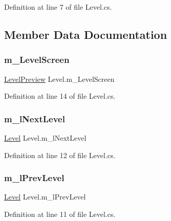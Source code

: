 Definition at line 7 of file Level.\+cs.



\subsection{Member Data Documentation}
\mbox{\label{class_level_a3c05dd260ac90122cd094bee059260e3}} 
\subsubsection{\texorpdfstring{m\+\_\+\+Level\+Screen}{m\_LevelScreen}}
{\footnotesize\ttfamily \mbox{\hyperlink{class_level_preview}{Level\+Preview}} Level.\+m\+\_\+\+Level\+Screen}



Definition at line 14 of file Level.\+cs.

\mbox{\label{class_level_af2050b246b238c342aaf60734ac0e533}} 
\subsubsection{\texorpdfstring{m\+\_\+l\+Next\+Level}{m\_lNextLevel}}
{\footnotesize\ttfamily \mbox{\hyperlink{class_level}{Level}} Level.\+m\+\_\+l\+Next\+Level}



Definition at line 12 of file Level.\+cs.

\mbox{\label{class_level_a5d13a734626467aa83674ffe7293c103}} 
\subsubsection{\texorpdfstring{m\+\_\+l\+Prev\+Level}{m\_lPrevLevel}}
{\footnotesize\ttfamily \mbox{\hyperlink{class_level}{Level}} Level.\+m\+\_\+l\+Prev\+Level}



Definition at line 11 of file Level.\+cs.

\mbox{\label{class_level_a43dd3dcb6745308d63be29012196c95b}} 
